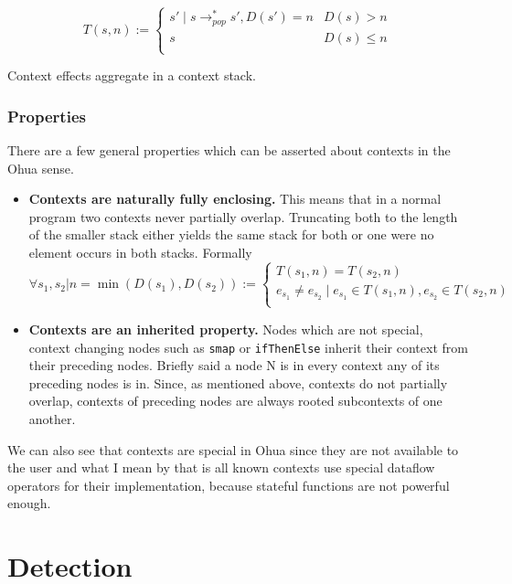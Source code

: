 \[
  T(s, n) :=
  \begin{cases}
    s' \mid s \rightarrow_{pop}^* s', D(s') = n & D(s) > n \\
    s & D(s) \leq n \\
  \end{cases}
\]

Context effects aggregate in a context stack.


\subsubsection{Properties}

There are a few general properties which can be asserted about contexts in the Ohua sense.

\begin{itemize}
  \item \textbf{Contexts are naturally fully enclosing.}
        This means that in a normal program two contexts never partially overlap.
        Truncating both to the length of the smaller stack either yields the same stack for both or one were no element occurs in both stacks.
        Formally
        \[
        \forall s_1, s_2 | n = \min(D(s_1), D(s_2)) :=
          \begin{cases}
            T(s_1, n) = T(s_2, n) \\
            e_{s_1} \neq e_{s_2} \mid e_{s_1} \in T(s_1, n), e_{s_2} \in T(s_2, n) \\
          \end{cases}
        \]

  \item \textbf{Contexts are an inherited property.}
        Nodes which are not special, context changing nodes such as \texttt{smap} or \texttt{ifThenElse} inherit their context from their preceding nodes.
        Briefly said a node N is in every context any of its preceding nodes is in.
        Since, as mentioned above, contexts do not partially overlap, contexts of preceding nodes are always rooted subcontexts of one another.
\end{itemize}

We can also see that contexts are special in Ohua since they are not available to the user and what I mean by that is all known contexts use special dataflow operators for their implementation, because stateful functions are not powerful enough.


\section{Detection}

